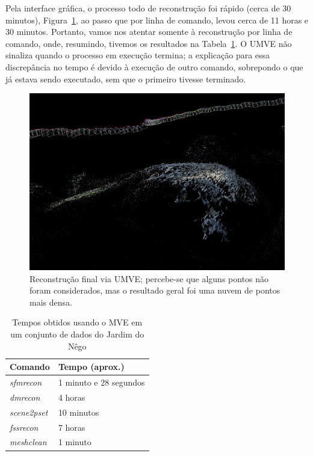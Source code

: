 Pela interface gráfica, o processo todo de reconstrução foi rápido (cerca de 30
minutos), Figura~\ref{fig:UMVEdense}, ao passo que por linha de comando, levou cerca de
11 horas e 30 minutos. Portanto, vamos nos atentar somente à reconstrução por
linha de comando, onde, resumindo, tivemos os resultados na Tabela~\ref{tab:mveSapo}. 
O UMVE não sinaliza quando o processo em execução termina; a explicação
para essa discrepância no tempo é devido à execução de outro comando, sobrepondo
o que já estava sendo executado, sem que o primeiro tivesse terminado.

\begin{figure}[!h]
	\centering
	\includegraphics[width=\linewidth]{figs/umvedense.png}
	\caption{%
  Reconstrução final via UMVE; percebe-se que alguns pontos não foram
  considerados, mas o resultado geral foi uma nuvem de pontos mais densa.
	}\label{fig:UMVEdense}
\end{figure} 

\begin{table}[!h]
\centering
\caption{Tempos obtidos usando o MVE em um conjunto de dados do Jardim do Nêgo}
\label{tab:mveSapo}
\begin{tabular}{|l|l|}
\hline
Comando            & Tempo (aprox.)    \\ \hline
\emph{sfmrecon}  & 1 minuto e 28 segundos     \\ \hline
\emph{dmrecon}   & 4 horas \\ \hline
\emph{scene2pset} & 10 minutos    \\ \hline
\emph{fssrecon}  & 7 horas \\ \hline
\emph{meshclean} & 1 minuto     \\ \hline
\end{tabular}
\end{table}

